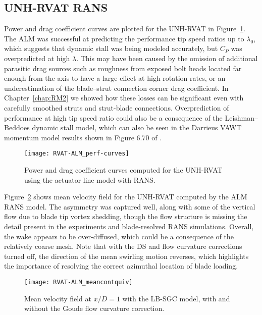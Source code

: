 \subsection{UNH-RVAT RANS}

Power and drag coefficient curves are plotted for the UNH-RVAT in
Figure~\ref{fig:RVAT-ALM-perf-curves}. The ALM was successful at predicting the
performance tip speed ratios up to $\lambda_0$, which suggests that dynamic
stall was being modeled accurately, but $C_P$ was overpredicted at high
$\lambda$. This may have been caused by the omission of additional parasitic
drag sources such as roughness from exposed bolt heads located far enough from
the axis to have a large effect at high rotation rates, or an underestimation of
the blade--strut connection corner drag coefficient. In Chapter~\ref{chap:RM2}
we showed how these losses can be significant even with carefully smoothed
struts and strut-blade connections. Overprediction of performance at high tip
speed ratio could also be a consequence of the Leishman--Beddoes dynamic stall
model, which can also be seen in the Darrieus VAWT momentum model results shown
in Figure 6.70 of \cite{Para2002}.

\begin{figure}
    \centering

    \texttt{[image: RVAT-ALM\_perf-curves]}

    \caption{Power and drag coefficient curves computed for the UNH-RVAT using
        the actuator line model with RANS.}

    \label{fig:RVAT-ALM-perf-curves}
\end{figure}

Figure~\ref{fig:RVAT-ALM-meancontquiv} shows mean velocity field for the
UNH-RVAT computed by the ALM RANS model. The asymmetry was captured well, along
with some of the vertical flow due to blade tip vortex shedding, though the flow
structure is missing the detail present in the experiments and blade-resolved
RANS simulations. Overall, the wake appears to be over-diffused, which could be
a consequence of the relatively coarse mesh. Note that with the DS and flow
curvature corrections turned off, the direction of the mean swirling motion
reverses, which highlights the importance of resolving the correct azimuthal
location of blade loading.

\begin{figure}
    \centering

    \texttt{[image: RVAT-ALM\_meancontquiv]}

    \caption{Mean velocity field at $x/D=1$ with the LB-SGC model, with and
        without the Goude flow curvature correction.}

    \label{fig:RVAT-ALM-meancontquiv}
\end{figure}

